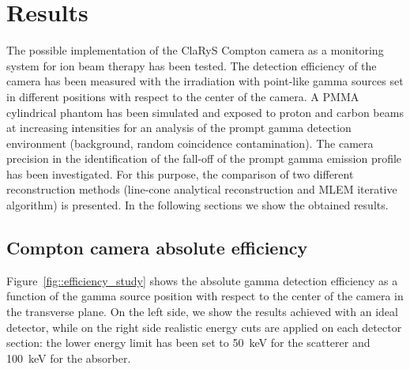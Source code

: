 \section{Results}

The possible implementation of the ClaRyS Compton camera as a monitoring system for ion beam therapy has been tested. The detection efficiency of the camera has been measured with the irradiation with point-like gamma sources set in different positions with respect to the center of the camera. A PMMA cylindrical phantom has been simulated and exposed to proton and carbon beams at increasing intensities for an analysis of the prompt gamma detection environment (background, random coincidence contamination). The camera precision in the identification of the fall-off of the prompt gamma emission profile has been investigated. For this purpose, the comparison of two different reconstruction methods (line-cone analytical reconstruction and MLEM iterative algorithm) is presented. In the following sections we show the obtained results. 


\subsection{Compton camera absolute efficiency}
\label{Results::efficiency}

Figure~\ref{fig::efficiency_study} shows the absolute gamma detection efficiency as a function of the gamma source position with respect to the center of the camera in the transverse plane. On the left side, we show the results achieved with an ideal detector, while on the right side realistic energy cuts are applied on each detector section: the lower energy limit  has been set to 50~keV for the scatterer and 100~keV for the absorber.

